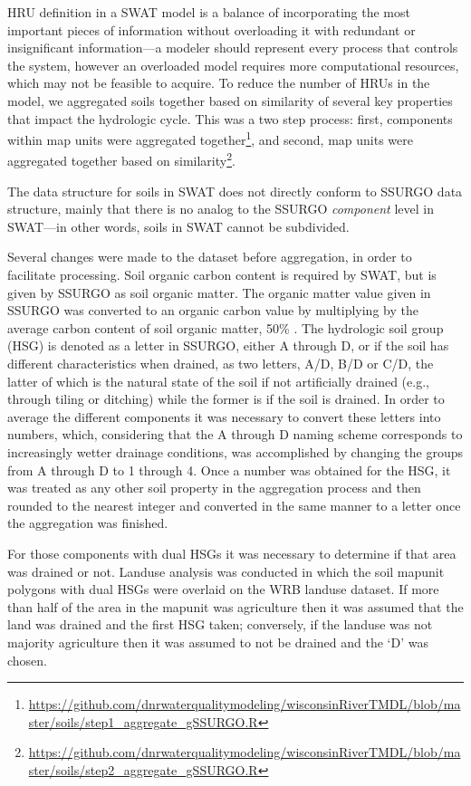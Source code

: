HRU definition in a SWAT model is a balance of incorporating the most important pieces of information without overloading it with redundant or insignificant information---a modeler should represent every process that controls the system, however an overloaded model requires more computational resources, which may not be feasible to acquire. To reduce the number of HRUs in the model, we aggregated soils together based on similarity of several key properties that impact the hydrologic cycle. This was a two step process: first, components within map units were aggregated together\footnote{\url{https://github.com/dnrwaterqualitymodeling/wisconsinRiverTMDL/blob/master/soils/step1_aggregate_gSSURGO.R}}, and second, map units were aggregated together based on similarity\footnote{\url{https://github.com/dnrwaterqualitymodeling/wisconsinRiverTMDL/blob/master/soils/step2_aggregate_gSSURGO.R}}.		

The data structure for soils in SWAT does not directly conform to SSURGO data structure, mainly that there is no analog to the SSURGO \textit{component} level in SWAT---in other words, soils in SWAT cannot be subdivided. 

Several changes were made to the dataset before aggregation, in order to facilitate processing. Soil organic carbon content is required by SWAT, but is given by SSURGO as soil organic matter. The organic matter value given in SSURGO was converted to an organic carbon value by multiplying by the average carbon content of soil organic matter, 50\% \citep{brady_elements_2004}. The hydrologic soil group (HSG) is denoted as a letter in SSURGO, either A through D, or if the soil has different characteristics when drained, as two letters, A/D, B/D or C/D, the latter of which is the natural state of the soil if not artificially drained (e.g., through tiling or ditching) while the former is if the soil is drained. In order to average the different components it was necessary to convert these letters into numbers, which, considering that the A through D naming scheme corresponds to increasingly wetter drainage conditions, was accomplished by changing the groups from A through D to 1 through 4. Once a number was obtained for the HSG, it was treated as any other soil property in the aggregation process and then rounded to the nearest integer and converted in the same manner to a letter once the aggregation was finished. 

For those components with dual HSGs it was necessary to determine if that area was drained or not. Landuse analysis was conducted in which the soil mapunit polygons with dual HSGs were overlaid on the WRB landuse dataset. If more than half of the area in the mapunit was agriculture then it was assumed that the land was drained and the first HSG taken; conversely, if the landuse was not majority agriculture then it was assumed to not be drained and the `D' was chosen.

